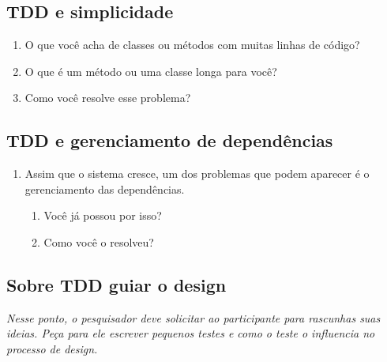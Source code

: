 \subsection{TDD e simplicidade}
\label{entrevista:simplicidade}

\begin{enumerate}

	\item O que você acha de classes ou métodos com muitas linhas de código?

	\item O que é um método ou uma classe longa para você?

	\item Como você resolve esse problema?

\end{enumerate}

\subsection{TDD e gerenciamento de dependências}
\label{entrevista:dependencias}

\begin{enumerate}

	\item Assim que o sistema cresce, um dos problemas que podem aparecer é o
	gerenciamento das dependências.
		
		\begin{enumerate}
		  \item Você já possou por isso?

		  \item Como você o resolveu?
		\end{enumerate}
		
\end{enumerate}

\subsection{Sobre TDD guiar o design}
\label{entrevista:tdd-guiar-design}

\textit{Nesse ponto, o pesquisador deve solicitar ao participante para
rascunhas suas ideias. Peça para ele escrever pequenos testes e como o teste
o influencia no processo de design.}

